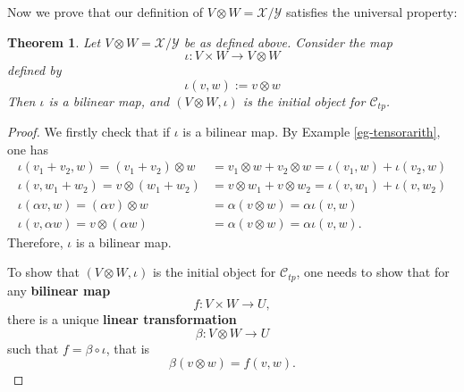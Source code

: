 \documentclass[12pt]{amsbook}
\newtheorem{theorem}{Theorem}[section]
\begin{document}
Now we prove that our definition of $V \otimes W = \mathcal{X}/\mathcal{Y}$ satisfies the universal property:
\begin{theorem} Let $V \otimes W = \mathcal{X}/\mathcal{Y}$ be as defined above. Consider the map 
$$\iota : V \times W \to V \otimes W$$ 
defined by
$$\iota(v,w) := v \otimes w$$
Then $\iota$ is a bilinear map, and $(V \otimes W, \iota)$ is the initial object for $\mathcal{C}_{tp}$.
\end{theorem}
\begin{proof}
    We firstly check that if $\iota$ is a bilinear map. By Example \ref{eg-tensorarith}, one has
    \begin{align*}
        \iota(v_1+v_2, w) = (v_1+v_2)\otimes w &= v_1 \otimes w + v_2 \otimes w = \iota(v_1, w) + \iota(v_2, w) \\
        \iota(v, w_1+w_2) = v\otimes (w_1+w_2) &= v \otimes w_1 + v \otimes w_2 = \iota(v, w_1) + \iota(v, w_2) \\
        \iota(\alpha v, w) = (\alpha v)\otimes w &= \alpha (v \otimes w) = \alpha \iota(v, w) \\
        \iota(v, \alpha w) = v\otimes (\alpha w) &= \alpha (v \otimes w) = \alpha \iota(v, w).
    \end{align*}
    Therefore, $\iota$ is a bilinear map.
    
    To show that $(V \otimes W, \iota)$ is the initial object for $\mathcal{C}_{tp}$, one needs to show that for any {\bf bilinear map}
    $$f : V \times W \to U,$$
    there is a unique {\bf linear transformation}
    $$\beta : V \otimes W \to U$$
    such that $f = \beta \circ \iota$, that is
    $$\beta (v \otimes w) = f(v, w).$$


\end{proof}
\end{document}
